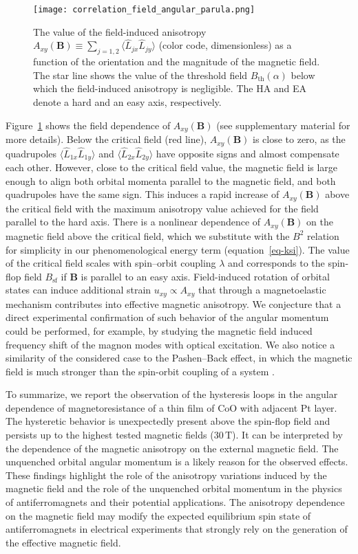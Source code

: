 \documentclass[%
 aps,
prl,
superscriptaddress,
 amsmath,amssymb,
reprint,%
]{revtex4-2}
\begin{document}
\begin{figure}
\texttt{[image: correlation\_field\_angular\_parula.png]}
\caption{\label{fig:L}The value of the field-induced anisotropy $A_{xy}(\mathbf{B})\equiv\sum_{j=1,2}\langle \hat{L}_{jx}\hat{L}_{jy}\rangle$ (color code, dimensionless) as a function of the orientation and the magnitude of the magnetic field. The star line shows the value of the threshold field $B_\mathrm{th}(\alpha)$ below which the field-induced anisotropy is negligible. The HA and EA denote a hard and an easy axis, respectively.}
\end{figure}
Figure~\ref{fig:L} shows the field dependence of $A_{xy}(\mathbf{B})$  (see supplementary material for more details). Below the critical field (red line), $A_{xy}(\mathbf{B})$ is close to zero, as the  quadrupoles $\langle \hat{L}_{1x}\hat{L}_{1y}\rangle$ and $\langle \hat{L}_{2x}\hat{L}_{2y}\rangle$ have opposite signs and almost compensate each other. However, close to the critical field value, the magnetic field is large enough to align both orbital momenta parallel to the magnetic field, and both quadrupoles have the same sign. This induces a rapid increase of $A_{xy}(\mathbf{B})$ above the critical field with the maximum anisotropy value achieved for the field parallel to the hard axis. There is a nonlinear dependence of $A_{xy}(\mathbf{B})$  on the magnetic field \cite{supplement} above the critical field, which we substitute with the $B^2$ relation for simplicity in our phenomenological energy term (equation~\ref{eq-ksi}). The value of the critical field scales with spin--orbit coupling $\lambda$ and corresponds to the spin-flop field $B_\mathrm{sf}$ if $\mathbf{B}$ is parallel to an easy axis. Field-induced rotation of orbital states can induce additional strain $u_{xy}\propto A_{xy}$ that through a magnetoelastic mechanism contributes into effective magnetic anisotropy.  We conjecture that a direct experimental confirmation of such behavior of the angular momentum could be performed, for example, by studying the magnetic field induced frequency shift of the magnon modes with optical excitation. We also notice a similarity of the considered case to the Pashen--Back effect, in which the magnetic field is much stronger than the spin-orbit coupling of a system \cite{LL}.

To summarize, we report the observation of the hysteresis loops in the angular dependence of magnetoresistance of a thin film of CoO with adjacent Pt layer. The hysteretic behavior is unexpectedly present above the spin-flop field and persists up to the highest tested magnetic fields ($30\,\text{T}$). It can be interpreted by the dependence of the magnetic anisotropy on the external magnetic field. The unquenched orbital angular momentum is a likely reason for the observed effects. These findings highlight the role of the anisotropy variations induced by the magnetic field and the role of the unquenched orbital momentum in the physics of antiferromagnets and their potential applications. The anisotropy dependence on the magnetic field may modify the expected equilibrium spin state of antiferromagnets in electrical experiments that strongly rely on the generation of the effective magnetic field.
\end{document}
